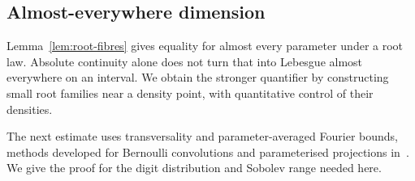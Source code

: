 \documentclass[11pt,a4paper]{amsart}
\numberwithin{equation}{section}
\theoremstyle{definition}
\begin{document}
\subsection{Almost-everywhere dimension}\label{sec:ae}

Lemma~\ref{lem:root-fibres} gives equality for almost every parameter
under a root law. Absolute continuity alone does not turn that into
Lebesgue almost everywhere on an interval. We obtain the stronger
quantifier by constructing small root families near a density point,
with quantitative control of their densities.

The next estimate uses transversality and parameter-averaged Fourier
bounds, methods developed for Bernoulli convolutions and parameterised
projections in~\cite{Solomyak1995,PeresSchlag2000}. We give the proof
for the digit distribution and Sobolev range needed here.
\end{document}
